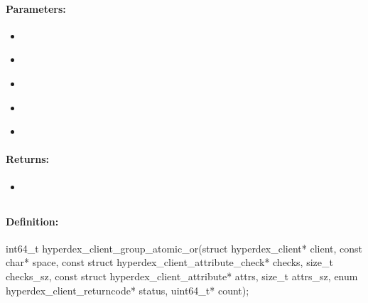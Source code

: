 \paragraph{Parameters:}
\begin{itemize}[noitemsep]
\item {}\\

\item {}\\

\item {}\\

\item {}\\

\item {}\\

\end{itemize}

\paragraph{Returns:}
\begin{itemize}[noitemsep]
\item {}\\

\end{itemize}

\pagebreak
\subsection{}
\label{api:c:group_atomic_or}


\paragraph{Definition:}
\begin{ccode}
int64_t hyperdex_client_group_atomic_or(struct hyperdex_client* client,
        const char* space,
        const struct hyperdex_client_attribute_check* checks, size_t checks_sz,
        const struct hyperdex_client_attribute* attrs, size_t attrs_sz,
        enum hyperdex_client_returncode* status,
        uint64_t* count);
\end{ccode}

